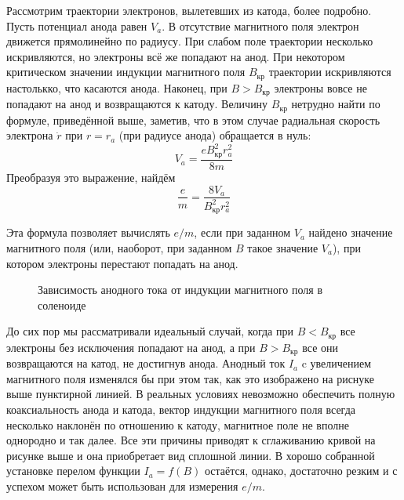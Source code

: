 \documentclass[a4paper,12pt]{article}
\begin{document}
	Рассмотрим траектории электронов, вылетевших из катода, более подробно. Пусть потенциал анода равен $V_a$. В отсутствие магнитного поля электрон движется прямолинейно по радиусу. При слабом поле траектории несколько искривляются, но электроны всё же попадают на анод. При некотором критическом значении индукции магнитного поля $B_\text{кр}$ траектории искривляются настолькко, что касаются анода. Наконец, при $B > B_\text{кр}$ электроны вовсе не попадают на анод и возвращаются к катоду. Величину $B_\text{кр}$ нетрудно найти по формуле, приведённой выше, заметив, что в этом случае радиальная скорость электрона $\dot r$ при $r = r_a$ (при радиусе анода) обращается в нуль:
	$$V_a = \frac{e B_\text{кр}^2 r_a^2}{8 m}$$
	Преобразуя это выражение, найдём 
	$$\frac{e}{m} = \frac{8 V_a}{B_\text{кр}^2 r_a^2}$$
	
	Эта формула позволяет вычислять $e / m$, если при заданном $V_a$ найдено значение магнитного поля (или, наоборот, при заданном $B$ такое значение $V_a$), при котором электроны перестают попадать на анод.
	\begin{figure}[h!]
		\caption[]{\label{fig:2} Зависимость анодного тока от индукции магнитного поля в соленоиде}
	\end{figure}	
	
	До сих пор мы рассматривали идеальный случай, когда при $B < B_\text{кр}$ все электроны без исключения попадают на анод, а при $B > B_\text{кр}$ все они возвращаются на катод, не достигнув анода. Анодный ток $I_a$ c увеличением магнитного поля изменялся бы при этом так, как это изображено на риснуке выше пунктирной линией. В реальных условиях невозможно обеспечить полную коаксиальность анода и катода, вектор индукции магнитного поля всегда несколько наклонён по отношению к катоду, магнитное поле не вполне однородно и так далее. Все эти причины приводят к сглаживанию кривой на рисунке выше и она приобретает вид сплошной линии. В хорошо собранной установке перелом функции $I_a = f(B)$ остаётся, однако, достаточно резким и с успехом может быть использован для измерения $e / m$.
\end{document}
